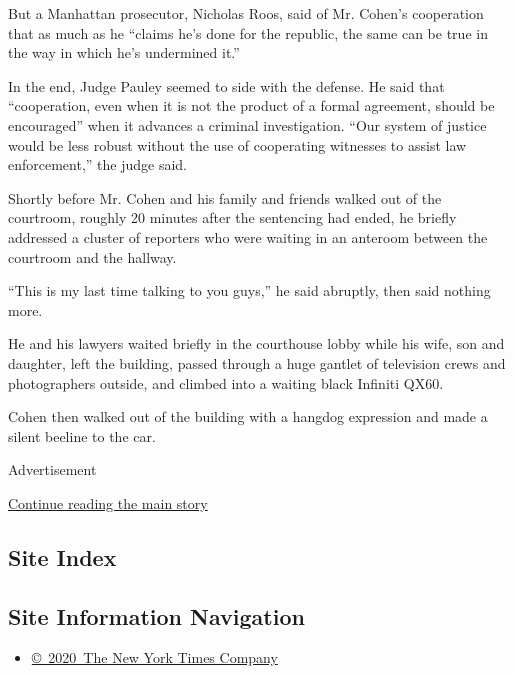 But a Manhattan prosecutor, Nicholas Roos, said of Mr. Cohen's
cooperation that as much as he ``claims he's done for the republic, the
same can be true in the way in which he's undermined it.''

In the end, Judge Pauley seemed to side with the defense. He said that
``cooperation, even when it is not the product of a formal agreement,
should be encouraged'' when it advances a criminal investigation. ``Our
system of justice would be less robust without the use of cooperating
witnesses to assist law enforcement,'' the judge said.

Shortly before Mr. Cohen and his family and friends walked out of the
courtroom, roughly 20 minutes after the sentencing had ended, he briefly
addressed a cluster of reporters who were waiting in an anteroom between
the courtroom and the hallway.

``This is my last time talking to you guys,'' he said abruptly, then
said nothing more.

He and his lawyers waited briefly in the courthouse lobby while his
wife, son and daughter, left the building, passed through a huge gantlet
of television crews and photographers outside, and climbed into a
waiting black Infiniti QX60.

Cohen then walked out of the building with a hangdog expression and made
a silent beeline to the car.

Advertisement

\protect\hyperlink{after-bottom}{Continue reading the main story}

\hypertarget{site-index}{%
\subsection{Site Index}\label{site-index}}

\hypertarget{site-information-navigation}{%
\subsection{Site Information
Navigation}\label{site-information-navigation}}

\begin{itemize}
\tightlist
\item
  \href{https://help.nytimes.com/hc/en-us/articles/115014792127-Copyright-notice}{©~2020~The
  New York Times Company}
\end{itemize}

